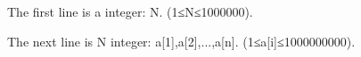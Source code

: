 The first line is a integer: N. (1≤N≤1000000).

The next line is N integer: a[1],a[2],...,a[n]. (1≤a[i]≤1000000000).